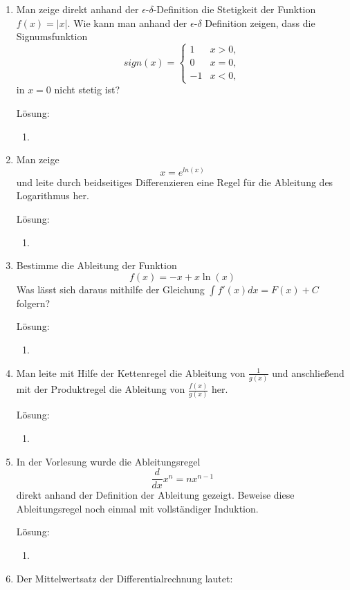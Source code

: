 \documentclass[../main.tex]{subfiles}
\begin{document}
\begin{enumerate}
	\item Man zeige direkt anhand der \( \epsilon \)-\( \delta \)-Definition die Stetigkeit der Funktion
	      \( f(x) = |x| \).
	      Wie kann man anhand der \( \epsilon \)-\(\delta \) Definition zeigen, dass die Signumsfunktion
	      \[ sign(x)= \begin{cases}
			      1  & x > 0, \\
			      0  & x = 0, \\
			      -1 & x < 0,
		      \end{cases}
	      \]
		  in \( x = 0 \) nicht stetig ist? 
		  
		  Lösung:
		  \begin{enumerate}
			  \item 
		  \end{enumerate}
	\item Man zeige
	      \[ x = e^{ln(x)} \]
	      und leite durch beidseitiges Differenzieren eine Regel für
	      die Ableitung des Logarithmus her.
		  
		  Lösung:
		  \begin{enumerate}
			  \item 
		  \end{enumerate}
	\item Bestimme die Ableitung der Funktion
	      \[ f(x) = -x + x \ln(x) \]
	      Was lässt sich daraus mithilfe der Gleichung
	      \( \int f'(x) dx = F(x) + C \) folgern?
		  
		  Lösung:
		  \begin{enumerate}
			  \item 
		  \end{enumerate}
	\item Man leite mit Hilfe der Kettenregel die Ableitung von \( \frac{1}{ g(x) } \) und anschließend
	      mit der Produktregel die Ableitung von \( \frac{ f(x) }{ g(x) } \) her.
		  
		  Lösung:
		  \begin{enumerate}
			  \item 
		  \end{enumerate}
	\item In der Vorlesung wurde die Ableitungsregel
	      \[ \frac{d}{dx} x^n = nx^{n-1} \]
	      direkt anhand der Definition der Ableitung gezeigt. Beweise diese Ableitungsregel
	      noch einmal mit vollständiger Induktion.
		  
		  Lösung:
		  \begin{enumerate}
			  \item 
		  \end{enumerate}
	\item Der Mittelwertsatz der Differentialrechnung lautet:


\end{enumerate}
\end{document}
